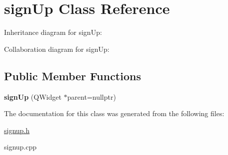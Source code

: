 \hypertarget{classsignUp}{}\section{sign\+Up Class Reference}
\label{classsignUp}


Inheritance diagram for sign\+Up\+:


Collaboration diagram for sign\+Up\+:
\subsection*{Public Member Functions}
\begin{DoxyCompactItemize}
\item 
\mbox{\label{classsignUp_a396f3114e429cc1c75270482c71429f0}} 
{\bfseries sign\+Up} (Q\+Widget $\ast$parent=nullptr)
\end{DoxyCompactItemize}


The documentation for this class was generated from the following files\+:\begin{DoxyCompactItemize}
\item 
\hyperlink{signup_8h}{signup.\+h}\item 
signup.\+cpp\end{DoxyCompactItemize}
